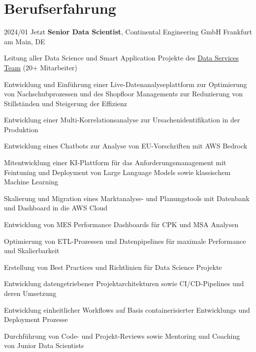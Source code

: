 \documentclass{maxcv}
\begin{document}
\section{Berufserfahrung}

\begin{twocolentry}{2024/01 \dash{} Jetzt}
    \textbf{Senior Data Scientist}, Continental Engineering GmbH \dash{} Frankfurt am Main, DE
\end{twocolentry}
\vspace{0.10 cm}
\begin{onecolentry}
    \begin{highlights}
        \item Leitung aller Data Science und Smart Application Projekte des \href{https://conti-engineering.com/solutions/consulting-support/data-services/}{Data Services Team} (20+ Mitarbeiter)
        \item Entwicklung und Einführung einer Live-Datenanalyseplattform zur Optimierung von Nachschubprozessen und des Shopfloor Managements zur Reduzierung von Stillständen und Steigerung der Effizienz
        \item Entwicklung einer Multi-Korrelationsanalyse zur Ursachenidentifikation in der Produktion
        \item Entwicklung eines Chatbots zur Analyse von EU-Vorschriften mit AWS Bedrock
        \item Mitentwicklung einer KI-Plattform für das Anforderungsmanagement mit Feintuning und Deployment von Large Language Models sowie klassischem Machine Learning
        \item Skalierung und Migration eines Marktanalyse- und Planungstools mit Datenbank und Dashboard in die AWS Cloud
        \item Entwicklung von MES Performance Dashboards für CPK und MSA Analysen
        \item Optimierung von ETL-Prozessen und Datenpipelines für maximale Performance und Skalierbarkeit
        \item Erstellung von Best Practices und Richtlinien für Data Science Projekte
        \item Entwicklung datengetriebener Projektarchitekturen sowie CI/CD-Pipelines und deren Umsetzung
        \item Entwicklung einheitlicher Workflows auf Basis containerisierter Entwicklungs und Deployment Prozesse
        \item Durchführung von Code- und Projekt-Reviews sowie Mentoring und Coaching von Junior Data Scientists
    \end{highlights}
\end{onecolentry}
\end{document}

